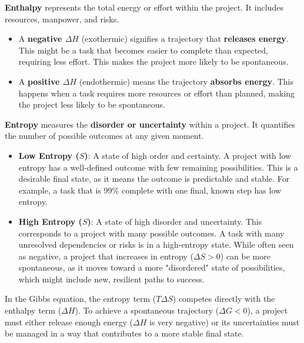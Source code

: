 \documentclass{article}
\begin{document}
\textbf{Enthalpy} represents the total energy or effort within the project. It includes resources, manpower, and risks.

\begin{itemize}
    \item A \textbf{negative $\Delta H$} (exothermic) signifies a trajectory that \textbf{releases energy}. This might be a task that becomes easier to complete than expected, requiring less effort. This makes the project more likely to be spontaneous.
    \item A \textbf{positive $\Delta H$} (endothermic) means the trajectory \textbf{absorbs energy}. This happens when a task requires more resources or effort than planned, making the project less likely to be spontaneous.
\end{itemize}

\textbf{Entropy} measures the \textbf{disorder or uncertainty} within a project. It quantifies the number of possible outcomes at any given moment.

\begin{itemize}
    \item \textbf{Low Entropy ($S$)}: A state of high order and certainty. A project with low entropy has a well-defined outcome with few remaining possibilities. This is a desirable final state, as it means the outcome is predictable and stable. For example, a task that is 99\% complete with one final, known step has low entropy.
    \item \textbf{High Entropy ($S$)}: A state of high disorder and uncertainty. This corresponds to a project with many possible outcomes. A task with many unresolved dependencies or risks is in a high-entropy state. While often seen as negative, a project that increases in entropy ($\Delta S > 0$) can be more spontaneous, as it moves toward a more "disordered" state of possibilities, which might include new, resilient paths to success.
\end{itemize}

In the Gibbs equation, the entropy term ($T\Delta S$) competes directly with the enthalpy term ($\Delta H$). To achieve a spontaneous trajectory ($\Delta G < 0$), a project must either release enough energy ($\Delta H$ is very negative) or its uncertainties must be managed in a way that contributes to a more stable final state.
\end{document}
